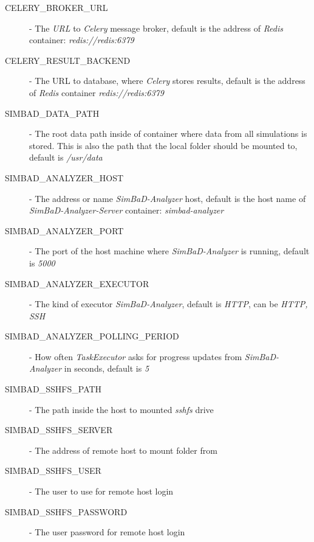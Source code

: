 \begin{description}
    \item
        [CELERY\_BROKER\_URL] - The \textit{URL} to \textit{Celery} message broker, default is the address of \textit{Redis} container: \emph{redis://redis:6379}
    
    \item 
        [CELERY\_RESULT\_BACKEND] - The URL to database, where \textit{Celery} stores results, default is the address of \textit{Redis} container \emph{redis://redis:6379}
    
    \item 
        [SIMBAD\_DATA\_PATH] - The root data path inside of container where data from all simulations is stored. This is also the path that the local folder should be mounted to, default is \emph{/usr/data}
    
    \item 
        [SIMBAD\_ANALYZER\_HOST] - The address or name \textit{SimBaD-Analyzer} host, default is the host name of \textit{SimBaD-Analyzer-Server} container: \emph{simbad-analyzer}
    
    \item 
        [SIMBAD\_ANALYZER\_PORT] - The port of the host machine where \textit{SimBaD-Analyzer} is running, default is \emph{5000} 
    
    \item 
        [SIMBAD\_ANALYZER\_EXECUTOR] - The kind of executor \textit{SimBaD-Analyzer}, default is \textit{HTTP}, can be \textit{HTTP, SSH}
     \item 
        [SIMBAD\_ANALYZER\_POLLING\_PERIOD] - How often \textit{TaskExecutor} asks for progress updates from \textit{SimBaD-Analyzer} in seconds, default is \textit{5}
    
    \item 
        [SIMBAD\_SSHFS\_PATH] - The path inside the host to mounted \textit{sshfs} drive
    
    \item 
        [SIMBAD\_SSHFS\_SERVER] - The address of remote host to mount folder from
    
    \item 
        [SIMBAD\_SSHFS\_USER] - The user to use for remote host login
    
    \item 
        [SIMBAD\_SSHFS\_PASSWORD] - The user password for remote host login
    
\end{description}
